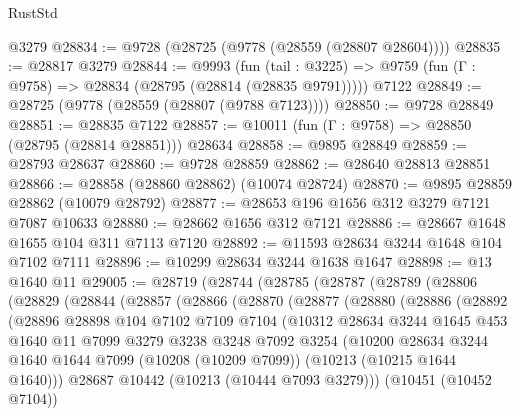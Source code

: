 \begin{lexlean}{RustStd}
\begin{coremodule}
{\begin{coremodule}
{{{{{{{{{{{{{{{{{{{{{{{{{{    @3279
@28834 := @9728 (@28725 (@9778 (@28559 (@28807 @28604))))
@28835 := @28817 @3279
@28844 := @9993
    (fun (tail : @3225) => @9759 (fun (Γ : @9758) => @28834 (@28795 (@28814 (@28835 @9791)))))
    @7122
@28849 := @28725 (@9778 (@28559 (@28807 (@9788 @7123))))
@28850 := @9728 @28849
@28851 := @28835 @7122
@28857 := @10011 (fun (Γ : @9758) => @28850 (@28795 (@28814 @28851))) @28634
@28858 := @9895 @28849
@28859 := @28793 @28637
@28860 := @9728 @28859
@28862 := @28640 @28813 @28851
@28866 := @28858 (@28860 @28862) (@10074 @28724)
@28870 := @9895 @28859 @28862 (@10079 @28792)
@28877 := @28653 @196 @1656 @312 @3279 @7121 @7087 @10633
@28880 := @28662 @1656 @312 @7121
@28886 := @28667 @1648 @1655 @104 @311 @7113 @7120
@28892 := @11593 @28634 @3244 @1648 @104 @7102 @7111
@28896 := @10299 @28634 @3244 @1638 @1647
@28898 := @13 @1640 @11
@29005 := @28719
    (@28744
      (@28785
        (@28787
          (@28789
            (@28806
              (@28829
                (@28844
                  (@28857
                    (@28866
                      (@28870
                        (@28877
                          (@28880
                            (@28886
                              (@28892
                                (@28896
                                  @28898
                                  @104
                                  @7102
                                  @7109
                                  @7104
                                  (@10312
                                    @28634
                                    @3244
                                    @1645
                                    @453
                                    @1640
                                    @11
                                    @7099
                                    @3279
                                    @3238
                                    @3248
                                    @7092
                                    @3254
                                    (@10200
                                      @28634
                                      @3244
                                      @1640
                                      @1644
                                      @7099
                                      (@10208 (@10209 @7099))
                                      (@10213 (@10215 @1644 @1640)))
                                    @28687
                                    @10442
                                    (@10213 (@10444 @7093 @3279)))
                                  (@10451 (@10452 @7104))
}}}}}}}}}}}}}}}}}}}}}}}}}}
\end{coremodule}}
\end{coremodule}
\end{lexlean}
